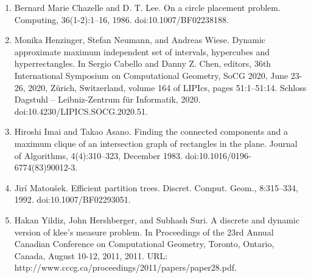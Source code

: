 \documentclass[10pt,a4paper]{article}
\begin{document}
\begin{enumerate}
\item[]  [12]  Bernard Marie Chazelle and D. T. Lee.  On a circle placement problem.  Computing, 36(1-2):1–16, 1986.  doi:10.1007/BF02238188.  
\item[]  [13]  Monika Henzinger, Stefan Neumann, and Andreas Wiese.  Dynamic approximate maximum independent set of intervals, hypercubes and hyperrectangles.  In Sergio Cabello and Danny Z. Chen, editors, 36th International Symposium on Computational Geometry, SoCG 2020, June 23-26, 2020, Zürich, Switzerland, volume 164 of LIPIcs, pages 51:1–51:14. Schloss Dagstuhl – Leibniz-Zentrum für Informatik, 2020.  doi:10.4230/LIPICS.SOCG.2020.51.  
\item[]  [14]  Hiroshi Imai and Takao Asano.  Finding the connected components and a maximum clique of an intersection graph of rectangles in the plane.  Journal of Algorithms, 4(4):310–323, December 1983.  doi:10.1016/0196-6774(83)90012-3.  
\item[]  [15]  Jirí Matoušek.  Efficient partition trees.  Discret. Comput. Geom., 8:315–334, 1992.  doi:10.1007/BF02293051.  
\item[]  [16]  Hakan Yildiz, John Hershberger, and Subhash Suri.  A discrete and dynamic version of klee’s measure problem.  In Proceedings of the 23rd Annual Canadian Conference on Computational Geometry, Toronto, Ontario, Canada, August 10-12, 2011, 2011.  URL: http://www.cccg.ca/proceedings/2011/papers/paper28.pdf.  
\end{enumerate}
\end{document}
